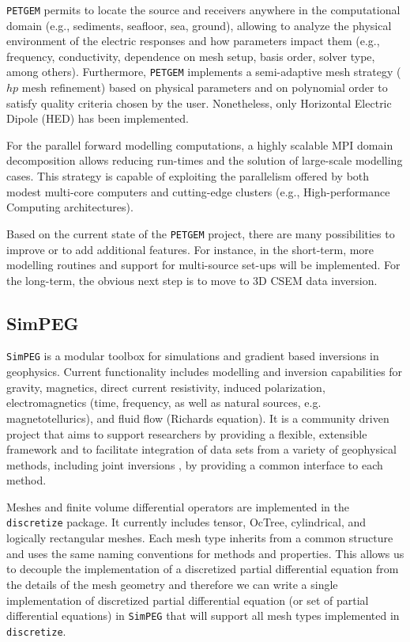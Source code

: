 \documentclass[
    paper,
  ]{geophysics}
\newcommand{\simpeg}{\texttt{SimPEG}\xspace}
\newcommand{\discretize}{\texttt{discretize}\xspace}
\newcommand{\petgem}{\texttt{PETGEM}\xspace}
\newcommand{\mycom}[2][]{\todo{\textbf{\uppercase{[#1]}}:~#2}}
\begin{document}
\petgem permits to locate the source and receivers anywhere in the
computational domain\mycom[DW]{I think this applies to all four codes} (e.g.,
sediments, seafloor, sea, ground), allowing to analyze the physical environment
of the electric responses and how parameters impact them (e.g., frequency,
conductivity, dependence on mesh setup, basis order, solver type, among
others). Furthermore, \petgem implements a semi-adaptive mesh strategy ($hp$
mesh refinement) based on physical parameters and on polynomial order to
satisfy quality criteria chosen by the user. Nonetheless, only Horizontal
Electric Dipole (HED) has been implemented.

For the parallel forward modelling computations, a highly scalable MPI domain
decomposition allows reducing run-times and the solution of large-scale
modelling cases. This strategy is capable of exploiting the parallelism offered
by both modest multi-core computers and cutting-edge clusters (e.g.,
High-performance Computing architectures).

Based on the current state of the \petgem project, there are many possibilities
to improve or to add additional features. For instance, in the short-term, more
modelling routines and support for multi-source set-ups will be implemented. For
the long-term, the obvious next step is to move to 3D CSEM data inversion.

\subsection{SimPEG}

\simpeg is a modular toolbox for simulations and gradient based inversions in
geophysics. Current functionality includes modelling and inversion
capabilities for gravity, magnetics, direct current resistivity, induced
polarization, electromagnetics (time, frequency, as well as natural sources,
e.g. magnetotellurics), and fluid flow (Richards equation). It is a community
driven project that aims to support researchers by providing a flexible,
extensible framework and to facilitate integration of data sets from a variety
of geophysical methods, including joint inversions \citep{GJI.20.Astic}, by
providing a common interface to each method.

Meshes and finite volume differential operators are implemented in the
\discretize package. It currently includes tensor, OcTree, cylindrical, and
logically rectangular meshes. Each mesh type inherits from a common structure
and uses the same naming conventions for methods and properties. This allows us
to decouple the implementation of a discretized partial differential equation
from the details of the mesh geometry and therefore we can write a single
implementation of discretized partial differential equation (or set of partial
differential equations) in \simpeg that will support all mesh types implemented
in \discretize.
\end{document}
